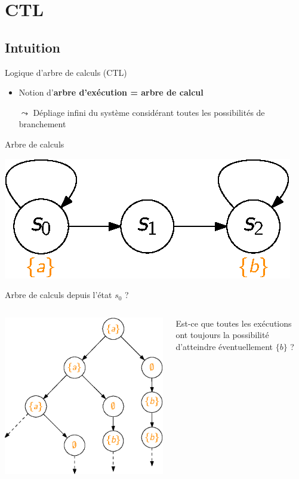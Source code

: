 \documentclass[compress]{beamer}
\begin{document}
\section{CTL}
\subsection{Intuition}

\begin{frame}{Logique d'arbre de calculs (CTL)}
\begin{itemize}
  \item Notion d'\textbf{\color{fibeamer@orange}arbre d'exécution = arbre de calcul}
  \item[$\leadsto$] Dépliage infini du système considérant toutes les possibilités de branchement
\end{itemize}
\end{frame}

\begin{frame}{Arbre de calculs}
\small
\begin{center}
  \includegraphics[width=0.35\linewidth]{resources/CTL_unfolding1}
\end{center}
  Arbre de calculs depuis l'état $s_0$ ? \\
\begin{columns}
\begin{column}{0.6\linewidth}
  \centering
  \includegraphics[width=0.6\linewidth]{resources/CTL_unfolding2}
\end{column}
\begin{column}{0.5\linewidth}
  Est-ce que toutes les exécutions ont toujours la possibilité d'atteindre
  éventuellement {\color{DarkOrange}$\{b\}$} ? \\
\end{column}
\end{columns}
\end{frame}
\end{document}
